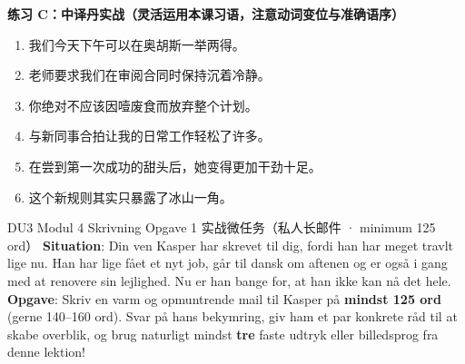 \textbf{练习 C：中译丹实战（灵活运用本课习语，注意动词变位与准确语序）}
\begin{enumerate}
  \item 我们今天下午可以在奥胡斯一举两得。
  \item 老师要求我们在审阅合同时保持沉着冷静。
  \item 你绝对不应该因噎废食而放弃整个计划。
  \item 与新同事合拍让我的日常工作轻松了许多。
  \item 在尝到第一次成功的甜头后，她变得更加干劲十足。
  \item 这个新规则其实只暴露了冰山一角。
\end{enumerate}


\begin{emailbox}{DU3 Modul 4 Skrivning Opgave 1 实战微任务（私人长邮件 · minimum 125 ord）}
\textbf{Situation}: Din ven Kasper har skrevet til dig, fordi han har meget travlt lige nu. Han har lige fået et nyt job, går til dansk om aftenen og er også i gang med at renovere sin lejlighed. Nu er han bange for, at han ikke kan nå det hele.\\
\textbf{Opgave}: Skriv en varm og opmuntrende mail til Kasper på \textbf{mindst 125 ord} (gerne 140--160 ord). Svar på hans bekymring, giv ham et par konkrete råd til at skabe overblik, og brug naturligt mindst \textbf{tre} faste udtryk eller billedsprog fra denne lektion!
\end{emailbox}

